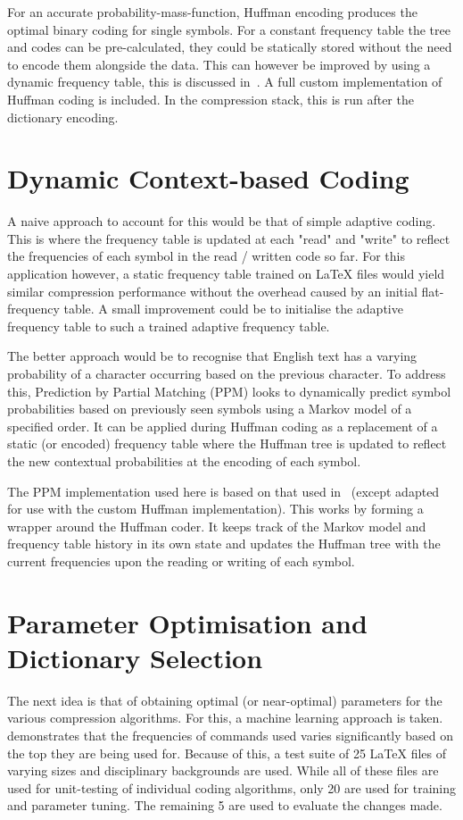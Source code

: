 \documentclass[11pt]{article}
\begin{document}
    For an accurate probability-mass-function, Huffman encoding produces the optimal binary coding for single symbols.
    For a constant frequency table the tree and codes can be pre-calculated, they could be statically stored without the need to encode them alongside the data.
    This can however be improved by using a dynamic frequency table, this is discussed in~.
    A full custom implementation of Huffman coding is included.
    In the compression stack, this is run after the dictionary encoding.


    \section{Dynamic Context-based Coding}\label{sec:ppm}
    A naive approach to account for this would be that of simple adaptive coding.
    This is where the frequency table is updated at each "read" and "write" to reflect the frequencies of each symbol in the read / written code so far.
    For this application however, a static frequency table trained on \LaTeX{} files would yield similar compression performance without the overhead caused by an initial flat-frequency table.
    A small improvement could be to initialise the adaptive frequency table to such a trained adaptive frequency table.

    The better approach would be to recognise that English text has a varying probability of a character occurring based on the previous character.
    To address this, Prediction by Partial Matching (PPM) looks to dynamically predict symbol probabilities based on previously seen symbols using a Markov model of a specified order.
    It can be applied during Huffman coding as a replacement of a static (or encoded) frequency table where the Huffman tree is updated to reflect the new contextual probabilities at the encoding of each symbol.

    The PPM implementation used here is based on that used in~\cite{reference-arithmetic-coding} (except adapted for use with the custom Huffman implementation).
    This works by forming a wrapper around the Huffman coder.
    It keeps track of the Markov model and frequency table history in its own state and updates the Huffman tree with the current frequencies upon the reading or writing of each symbol.


    \section{Parameter Optimisation and Dictionary Selection}\label{sec:parameter-optimisation}
    The next idea is that of obtaining optimal (or near-optimal) parameters for the various compression algorithms.
    For this, a machine learning approach is taken.
    ~\cite{latex_command_frequencies} demonstrates that the frequencies of commands used varies significantly based on the top they are being used for.
    Because of this, a test suite of 25 \LaTeX{} files of varying sizes and disciplinary backgrounds are used.
    While all of these files are used for unit-testing of individual coding algorithms, only 20 are used for training and parameter tuning.
    The remaining 5 are used to evaluate the changes made.
\end{document}
